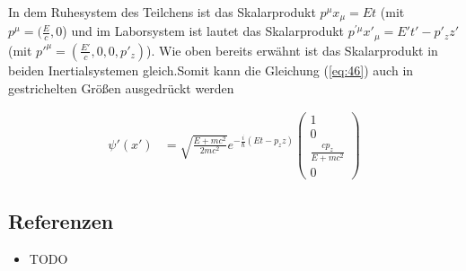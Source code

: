 In dem Ruhesystem des Teilchens ist das Skalarprodukt \(p^{\mu}x_{\mu}=Et\) (mit \(p^{\mu} = (\frac{E}{c},0\)) und im Laborsystem ist lautet das Skalarprodukt \(p^{'\mu}x'_{\mu}=E't'-p'_zz'\) (mit \(p'^{\mu}=(\frac{E'}{c},0,0,p'_z)\)). Wie oben bereits erwähnt ist das Skalarprodukt in beiden Inertialsystemen gleich.Somit kann die Gleichung (\ref{eq:46}) auch in gestrichelten Größen ausgedrückt werden

\begin{align}
  \label{eq:47}
  \psi'(x') &=\sqrt{\frac{E + mc^2}{2mc^2}}e^{-\frac{i}{\hbar}(Et-p_z z) }
   \begin{pmatrix}
      1\\0\\\frac{cp_z}{E+mc^2}\\0
    \end{pmatrix}
\end{align}


\subsection*{Referenzen}
\begin{itemize}
\item TODO
\end{itemize}
  

